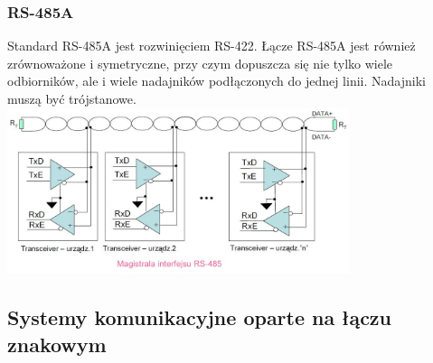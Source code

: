 		\subsubsection{RS-485A}
		Standard RS-485A jest rozwinięciem RS-422. Łącze RS-485A jest również zrównoważone i symetryczne, przy czym dopuszcza się nie tylko wiele odbiorników, ale i wiele nadajników podłączonych do jednej linii. Nadajniki muszą być trójstanowe.\\
		\includegraphics[width=10cm]{./wyklady/RS232_13_1.jpg}
	\subsection{Systemy komunikacyjne oparte na łączu znakowym}
